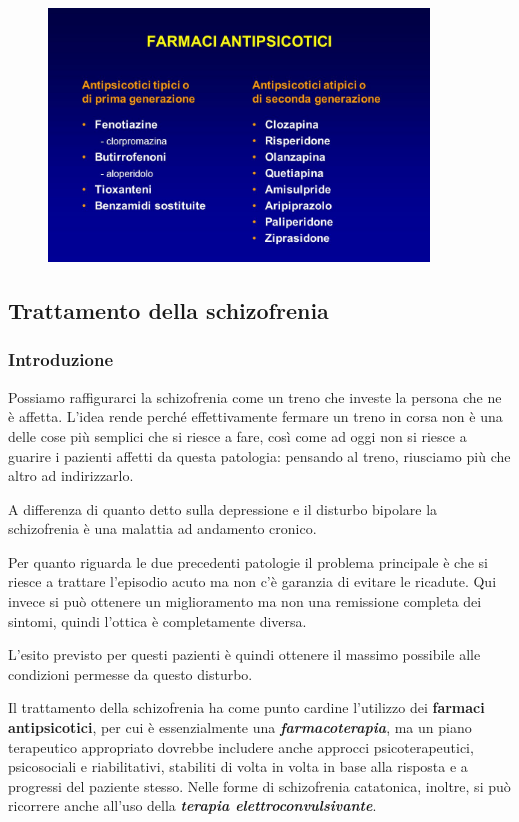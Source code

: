 \begin{figure}[!ht]
\centering
	\includegraphics[width=0.9\textwidth]{07/image1.jpeg}
\end{figure}

\subsection{Trattamento della schizofrenia}

\subsubsection{Introduzione}

Possiamo raffigurarci la schizofrenia come un treno che investe la
persona che ne è affetta. L'idea rende perché effettivamente fermare un
treno in corsa non è una delle cose più semplici che si riesce a fare,
così come ad oggi non si riesce a guarire i pazienti affetti da questa
patologia: pensando al treno, riusciamo più che altro ad indirizzarlo.

A differenza di quanto detto sulla depressione e il disturbo bipolare la
schizofrenia è una malattia ad andamento cronico.

Per quanto riguarda le due precedenti patologie il problema principale è
che si riesce a trattare l'episodio acuto ma non c'è garanzia di evitare
le ricadute. Qui invece si può ottenere un miglioramento ma non una
remissione completa dei sintomi, quindi l'ottica è completamente
diversa.

L'esito previsto per questi pazienti è quindi ottenere il massimo
possibile alle condizioni permesse da questo disturbo.

Il trattamento della schizofrenia ha come punto cardine l'utilizzo dei
\textbf{farmaci antipsicotici}, per cui è essenzialmente una
\textbf{\emph{farmacoterapia}}, ma un piano terapeutico appropriato
dovrebbe includere anche approcci psicoterapeutici, psicosociali e
riabilitativi, stabiliti di volta in volta in base alla risposta e a
progressi del paziente stesso. Nelle forme di schizofrenia catatonica,
inoltre, si può ricorrere anche all'uso della \textbf{\emph{terapia
elettroconvulsivante}}.


